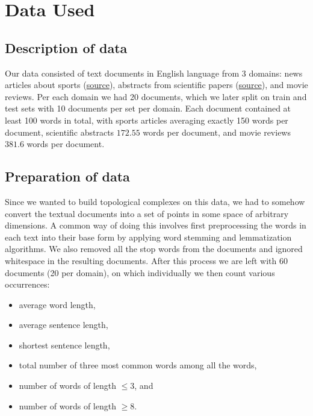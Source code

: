 \section{Data Used}
\label{sec:data_used}

\subsection{Description of data}
\label{sub:description_of_data}

Our data consisted of text documents in English language from 3 domains: news
articles about sports (\href{http://mlg.ucd.ie/datasets/bbc.html}{source}),
abstracts from scientific papers (\href{http://eprints.fri.uni-lj.si/cgi/latest_tool?mode=articles}{source}), and movie reviews. Per each domain we had 20
documents, which we later split on train and test sets with 10 documents per
set per domain. Each document contained at least 100 words in total, with
sports articles averaging exactly 150 words per document, scientific abstracts
$172.55$ words per document, and movie reviews $381.6$ words per document.
\subsection{Preparation of data}
\label{sub:preparation_of_data}

Since we wanted to build topological complexes on this data, we had to somehow
convert the textual documents into a set of points in some space of arbitrary
dimensions. A common way of doing this involves first preprocessing the words
in each text into their base form by applying word stemming and lemmatization
algorithms. We also removed all the stop words from the documents and ignored
whitespace in the resulting documents. After this process we are left with 60
documents (20 per domain), on which individually we then count various
occurrences:

\begin{itemize}
  \item average word length,
  \item average sentence length,
  \item shortest sentence length,
  \item total number of three most common words among all the words,
  \item number of words of length $\le 3$, and
  \item number of words of length $\ge 8$.
\end{itemize}

